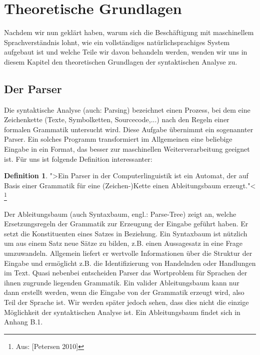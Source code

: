 \documentclass[12pt,a4paper]{article}
\theoremstyle{definition}
\begin{document}
\section{Theoretische Grundlagen}
	Nachdem wir nun geklärt haben, warum sich die Beschäftigung mit maschinellem Sprachverständnis lohnt, wie ein vollständiges natürlichsprachiges System aufgebaut ist und welche Teile wir davon behandeln werden, wenden wir uns in diesem Kapitel den theoretischen Grundlagen der syntaktischen Analyse zu.

	\subsection{Der Parser}
		Die syntaktische Analyse (auch: Parsing) bezeichnet einen Prozess, bei dem eine Zeichenkette (Texte, Symbolketten, Sourcecode,...) nach den Regeln einer formalen Grammatik untersucht wird. Diese Aufgabe übernimmt ein sogenannter Parser. Ein solches Programm transformiert im Allgemeinen eine beliebige Eingabe in ein Format, das besser zur maschinellen Weiterverarbeitung geeignet ist. Für uns ist folgende Definition interessanter:
	
			\newtheorem{Parser}{Definition}[subsection]
			\begin{Parser}
				">Ein Parser in der Computerlinguistik ist ein Automat, der auf Basis einer Grammatik für eine (Zeichen-)Kette einen Ableitungsbaum erzeugt."<
				\footnote{Aus: [Petersen 2010]}
			\end{Parser}

	
		Der Ableitungsbaum (auch Syntaxbaum, engl.: Parse-Tree) zeigt an, welche Ersetzungsregeln der Grammatik zur Erzeugung der Eingabe geführt haben. Er  setzt die Konstituenten eines Satzes in Beziehung. Ein Syntaxbaum ist nützlich um aus einem Satz neue Sätze zu bilden, z.B. einen Aussagesatz in eine Frage umzuwandeln. Allgemein liefert er wertvolle Informationen über die Struktur der Eingabe und ermöglicht z.B. die Identifizierung von Handelnden oder Handlungen im Text. Quasi nebenbei entscheiden Parser das Wortproblem für Sprachen der ihnen zugrunde liegenden Grammatik. Ein valider Ableitungsbaum kann nur dann erstellt werden, wenn die Eingabe von der Grammatik erzeugt wird, also Teil der Sprache ist. Wir werden später jedoch sehen, dass dies nicht die einzige Möglichkeit der syntaktischen Analyse ist. Ein Ableitungsbaum findet sich in Anhang B.1.
	
\end{document}
